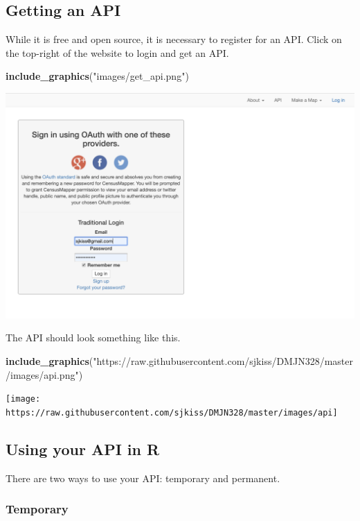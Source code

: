 \documentclass[
]{article}
\newenvironment{Shaded}{\begin{snugshade}}{\end{snugshade}}
\newcommand{\KeywordTok}[1]{\textcolor[rgb]{0.13,0.29,0.53}{\textbf{#1}}}
\newcommand{\NormalTok}[1]{#1}
\newcommand{\StringTok}[1]{\textcolor[rgb]{0.31,0.60,0.02}{#1}}
\begin{document}
\hypertarget{getting-an-api}{%
\subsection{Getting an API}\label{getting-an-api}}

While it is free and open source, it is necessary to register for an
API. Click on the top-right of the website to login and get an API.

\begin{Shaded}
\begin{Highlighting}[]
\KeywordTok{include\_graphics}\NormalTok{(}\StringTok{"images/get\_api.png"}\NormalTok{)}
\end{Highlighting}
\end{Shaded}

\begin{center}\includegraphics[width=0.5\linewidth]{images/get_api} \end{center}

The API should look something like this.

\begin{Shaded}
\begin{Highlighting}[]
\KeywordTok{include\_graphics}\NormalTok{(}\StringTok{"https://raw.githubusercontent.com/sjkiss/DMJN328/master/images/api.png"}\NormalTok{)}
\end{Highlighting}
\end{Shaded}

\begin{center}\texttt{[image: https://raw.githubusercontent.com/sjkiss/DMJN328/master/images/api]} \end{center}

\hypertarget{using-your-api-in-r}{%
\subsection{Using your API in R}\label{using-your-api-in-r}}

There are two ways to use your API: temporary and permanent.

\hypertarget{temporary}{%
\subsubsection{Temporary}\label{temporary}}
\end{document}
